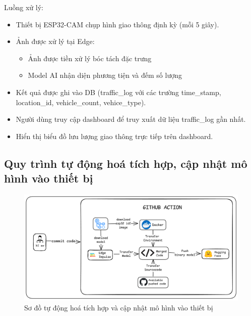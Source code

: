 \begin{enumerate}
    \quad Luồng xử lý:
    \begin{itemize}
        \item Thiết bị ESP32-CAM chụp hình giao thông định kỳ (mỗi 5 giây).
        \item Ảnh được xử lý tại Edge:
        \begin{itemize}
            \item Ảnh được tiền xử lý bóc tách đặc trưng
            \item Model AI nhận diện phương tiện và đếm số lượng
        \end{itemize}
        \item Kết quả được ghi vào DB (traffic\_log với các trường time\_stamp, location\_id, vehicle\_count, vehice\_type).
        \item Người dùng truy cập dashboard để truy xuất dữ liệu traffic\_log gần nhất.
        \item Hiển thị biểu đồ lưu lượng giao thông trực tiếp trên dashboard.

    \end{itemize}


\end{enumerate}
\subsection{Quy trình tự động hoá tích hợp, cập nhật mô hình vào thiết bị}

\begin{figure}[H]
    \centering
    \includegraphics[width=1\textwidth]{image/cicd.png}
    \caption{Sơ đồ tự động hoá tích hợp và cập nhật mô hình vào thiết bị}
    \label{fig:architecture}
\end{figure}

